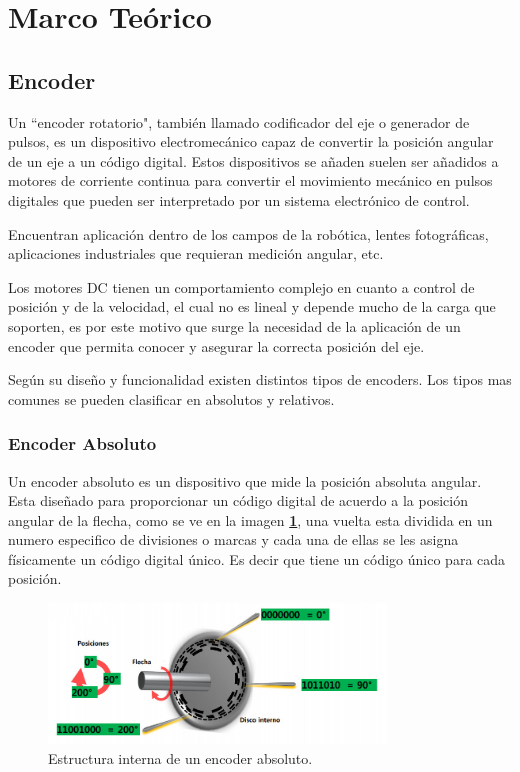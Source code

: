 \documentclass[11pt, a4paper]{article}
\begin{document}
\section{Marco Teórico}
	\subsection{Encoder}
	Un ``encoder rotatorio", también llamado codificador del eje o generador de pulsos, es un dispositivo electromecánico capaz de convertir la posición angular de un eje a un código digital. Estos dispositivos se añaden suelen ser añadidos a motores de corriente continua para convertir el movimiento mecánico en pulsos digitales que pueden ser interpretado por un sistema electrónico de control. 

	Encuentran aplicación dentro de los campos de la robótica, lentes fotográficas, aplicaciones industriales que requieran medición angular, etc.

	Los motores DC tienen un comportamiento complejo en cuanto a control de posición y de la velocidad, el cual no es lineal y depende mucho de la carga que soporten, es por este motivo que surge la necesidad de la aplicación de un encoder que permita conocer y asegurar la correcta posición del eje.

	Según su diseño y funcionalidad existen distintos tipos de encoders. Los tipos mas comunes se pueden clasificar en absolutos y relativos.

	\subsubsection{Encoder Absoluto}
	Un encoder absoluto es un dispositivo que mide la posición absoluta angular. Esta diseñado para proporcionar un código digital de acuerdo a la posición angular de la flecha, como se ve en la imagen \textcolor{blue}{\textbf{\ref{fig:encoder_absoluto}}}, una vuelta esta dividida en un numero especifico de divisiones o marcas y cada una de ellas se les asigna físicamente un código digital único. Es decir que tiene un código único para cada posición. 

\begin{figure}[h]
	\centering
	\includegraphics[width=0.8\textwidth]{Imagenes/encoder_absoluto.jpg}
	\caption{Estructura interna de un encoder absoluto.}
	\label{fig:encoder_absoluto}
\end{figure} 
\end{document}
